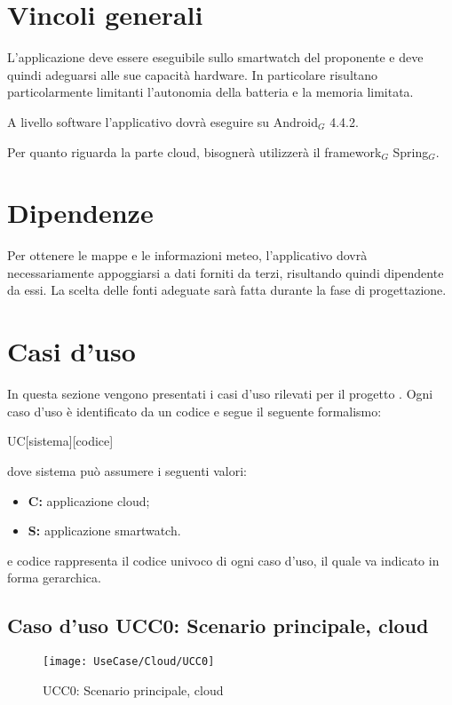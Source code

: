 \section{Vincoli generali}
L'applicazione deve essere eseguibile sullo smartwatch del proponente e deve quindi adeguarsi alle sue capacità hardware. In particolare risultano particolarmente limitanti l'autonomia della batteria e la memoria limitata.

A livello software l'applicativo dovrà eseguire su Android$_{G}$ 4.4.2.

Per quanto riguarda la parte cloud, bisognerà utilizzerà il framework$_{G}$ Spring$_{G}$.

\section{Dipendenze}
Per ottenere le mappe e le informazioni meteo, l'applicativo dovrà necessariamente appoggiarsi a dati forniti da terzi, risultando quindi dipendente da essi. La scelta delle fonti adeguate sarà fatta durante la fase di progettazione.

\section{Casi d'uso}
In questa sezione vengono presentati i casi d'uso rilevati per il progetto \CAPITOLATO{}. Ogni caso d'uso è identificato da un codice e segue il seguente formalismo: 
\begin{center}
UC[sistema][codice] 
\end{center} 
dove sistema può assumere i seguenti valori:
\begin{itemize}
\item \textbf{C:} applicazione cloud;
\item \textbf{S:} applicazione smartwatch.
\end{itemize}

e codice rappresenta il codice univoco di ogni caso d'uso, il quale va indicato in forma gerarchica.


\subsection{Caso d'uso UCC0: Scenario principale, cloud}

\begin{figure}[H]
\centering
\texttt{[image: UseCase/Cloud/UCC0]}
\caption{UCC0: Scenario principale, cloud}
\end{figure}

